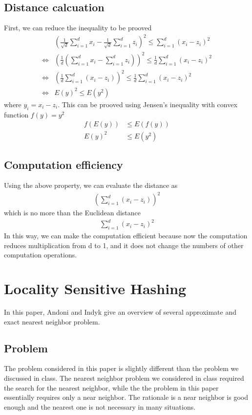 \documentclass[12pt]{article}
\begin{document}
\begin{multicols}{2}
  \subsection{Distance calcuation}
  First, we can reduce the inequality to be prooved
  \begin{align*}
    & ( \frac{1}{\sqrt{d}} \sum_{i=1}^{d}x_i - \frac{1}{\sqrt{d}} \sum_{i=1}^{d}z_i )^2 \leq \sum_{i=1}^{d}(x_i - z_i)^2 \\
    \iff & ( \frac{1}{d} ( \sum_{i=1}^{d}x_i - \sum_{i=1}^{d}z_i) )^2 \leq \frac{1}{d} \sum_{i=1}^{d} (x_i - z_i)^2 \\
    \iff & ( \frac{1}{d} \sum_{i=1}^{d}(x_i-z_i) )^2 \leq \frac{1}{d} \sum_{i=1}^{d} (x_i - z_i)^2 \\
    \iff & E(y)^2 \leq E(y^2)
  \end{align*}
  where $y_i=x_i-z_i$. This can be prooved using Jensen's inequality with convex function $ f(y) = y^2 $
  \begin{align*}
    f(E(y)) &\leq E(f(y)) \\
    E(y)^2 &\leq E(y^2)
  \end{align*}
  \subsection{Computation efficiency}
  Using the above property, we can evaluate the distance as
  \begin{align*}
    ( \sum_{i=1}^{d}(x_i-z_i) )^2
  \end{align*}
  which is no more than the Euclidean distance
  \begin{align*}
    \sum_{i=1}^{d} (x_i - z_i)^2
  \end{align*}
  In this way, we can make the computation efficient because now the computation reduces multiplication from d to 1, and it does not change the numbers of other computation operations.
  \section{Locality Sensitive Hashing}
  In this paper, Andoni and Indyk give an overview of several approximate and exact nearest neighbor problem.
  \subsection{Problem}
  The problem considered in this paper is slightly different than the problem we discussed in class. The nearest neighbor problem we considered in class required the search for the nearest neighbor, while the the problem in this paper essentially requires only a near neighbor. The rationale is a near neighbor is good enough and the nearest one is not necessary in many situations.

\end{multicols}
\end{document}
